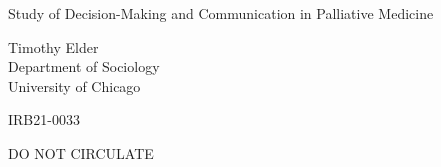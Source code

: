 \documentclass[titlepage]{article}
\begin{document}
\begin{titlepage}
    \begin{center}
        \vspace*{5cm}
 
        \large{Study of Decision-Making and Communication in Palliative Medicine}
 
        \vspace{2cm}
 
        Timothy Elder \\
        Department of Sociology \\
        University of Chicago \\
 
        \vfill
             
        IRB21-0033
             
        \vspace{0.8cm}
          
        DO NOT CIRCULATE
             
    \end{center}
 \end{titlepage}
\end{document}
